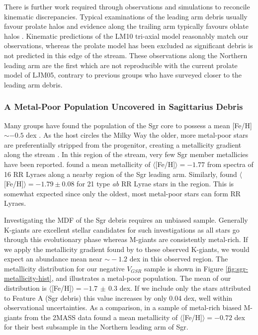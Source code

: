 \documentclass[preprint2]{aastex}
\begin{document}
	There is further work required through observations and simulations to reconcile kinematic discrepancies. Typical examinations of the leading arm debris usually favour prolate halos and evidence along the trailing arm typically favours oblate halos \citep{Helmi_2004, Martinez-Delgado;et-al_2004, Law;et-al_2005}. Kinematic predictions of the LM10 tri-axial model reasonably match our observations, whereas the prolate model has been excluded as significant debris is not predicted in this edge of the stream. These observations along the Northern leading arm are the first which are not reproducible with the current prolate model of LJM05, contrary to previous groups who have surveyed closer to the leading arm debris.

	\subsubsection{A Metal-Poor Population Uncovered in Sagittarius Debris}
	\label{sec:sgr-metal-poor}
		
	Many groups have found the population of the Sgr core to possess a mean [Fe/H] $\sim -0.5$ dex \citep{Cacciari;et-al_2002, Bonifacio;et-al_2004, Monaco;et-al_2005}. As the host circles the Milky Way the older, more metal-poor stars are preferentially stripped from the progenitor, creating a metallicity gradient along the stream \citep{Chou;et-al_2007, Keller;Yong;Da_Costa_2010}. In this region of the stream, very few Sgr member metallicies have been reported. \citet{Vivas;et-al_2005} found a mean metallicity of $\langle$[Fe/H]$\rangle = -1.77$ from spectra of 16 RR Lyraes along a nearby region of the Sgr leading arm. Similarly, \citet{Prior;et-al_2009b} found $\langle$[Fe/H]$\rangle = -1.79 \pm 0.08$ for 21 type \textit{ab} RR Lyrae stars in the region. This is somewhat expected since only the oldest, most metal-poor stars can form RR Lyraes. 
	
	Investigating the MDF of the Sgr debris requires an unbiased sample. Generally K-giants are excellent stellar candidates for such investigations as all stars go through this evolutionary phase whereas M-giants are consistently metal-rich. If we apply the metallicity gradient found by \citet[][from M-giants]{Keller;Yong;Da_Costa_2010} to these observed K-giants, we would expect an abundance mean near $\sim{}-1.2$ dex in this observed region. The metallicity distribution for our negative $V_{GSR}$ sample is shown in Figure \ref{fig:sgr-metallicity-hist}, and illustrates a metal-poor population. The mean of our distribution is $\langle$[Fe/H]$\rangle = -1.7\,\pm\,0.3$ dex. If we include only the stars attributed to Feature A (Sgr debris) this value increases by only 0.04 dex, well within observational uncertainties. As a comparison, in a sample of metal-rich biased M-giants from the 2MASS data \citet{Chou;et-al_2007} found a mean metallicity of $\langle$[Fe/H]$\rangle = -0.72$ dex for their best subsample in the Northern leading arm of Sgr.
	
\end{document}
